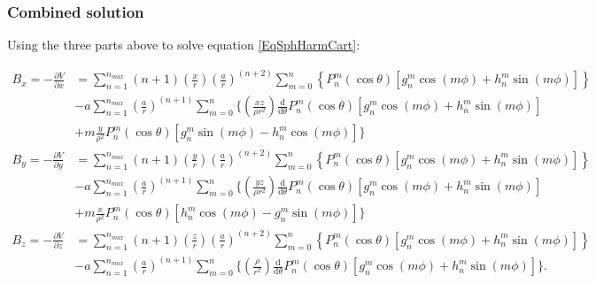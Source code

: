 \documentclass[]{article}
\begin{document}
		\subsubsection{Combined solution}	
			
			Using the three parts above to solve equation \ref{EqSphHarmCart}:
			
			\begin{align}
				B_x = -\frac{\partial V}{\partial x} &= \sum_{n=1}^{n_{max}} (n + 1)\left(\frac{x}{r}\right)\left(\frac{a}{r}\right)^{(n+2)} \sum_{m=0}^{n} \left\{ P_n^m(\cos{\theta}) \left[ g_n^m \cos{(m\phi)} + h_n^m \sin{(m\phi)}\right] \right\}    \nonumber \\
				&- a \sum_{n=1}^{n_{max}} \left(\frac{a}{r}\right)^{(n+1)} \sum_{m=0}^{n} \biggl\{ \left(\frac{xz}{\rho r^2}\right)\frac{\text{d}}{\text{d} \theta} P_n^m(\cos{\theta}) \left[g_n^m \cos{(m\phi)} + h_n^m \sin{(m\phi)} \right] \nonumber \\
				&+ m\frac{y}{\rho^2} P_n^m(\cos{\theta}) \left[ g_n^m\sin{(m\phi)} - h_n^m \cos{(m\phi)}\right]  \biggr\} \\
				B_y = -\frac{\partial V}{\partial y} &= \sum_{n=1}^{n_{max}} (n + 1)\left(\frac{y}{r}\right)\left(\frac{a}{r}\right)^{(n+2)} \sum_{m=0}^{n} \left\{ P_n^m(\cos{\theta}) \left[ g_n^m \cos{(m\phi)} + h_n^m \sin{(m\phi)}\right] \right\}    \nonumber \\
				&- a \sum_{n=1}^{n_{max}} \left(\frac{a}{r}\right)^{(n+1)} \sum_{m=0}^{n} \biggl\{ \left(\frac{yz}{\rho r^2}\right)\frac{\text{d}}{\text{d} \theta} P_n^m(\cos{\theta}) \left[g_n^m \cos{(m\phi)} + h_n^m \sin{(m\phi)} \right] \nonumber \\
				&+ m\frac{x}{\rho^2} P_n^m(\cos{\theta}) \left[ h_n^m \cos{(m\phi)} - g_n^m\sin{(m\phi)}\right]  \biggr\} \\
				B_z = -\frac{\partial V}{\partial z} &= \sum_{n=1}^{n_{max}} (n + 1)\left(\frac{z}{r}\right)\left(\frac{a}{r}\right)^{(n+2)} \sum_{m=0}^{n} \left\{ P_n^m(\cos{\theta}) \left[ g_n^m \cos{(m\phi)} + h_n^m \sin{(m\phi)}\right] \right\}    \nonumber \\
				&- a \sum_{n=1}^{n_{max}} \left(\frac{a}{r}\right)^{(n+1)} \sum_{m=0}^{n} \biggl\{ \left(\frac{\rho}{ r^2}\right)\frac{\text{d}}{\text{d} \theta} P_n^m(\cos{\theta}) \left[g_n^m \cos{(m\phi)} + h_n^m \sin{(m\phi)} \right]  \biggr\}.				
			\end{align}
			


\end{document}

